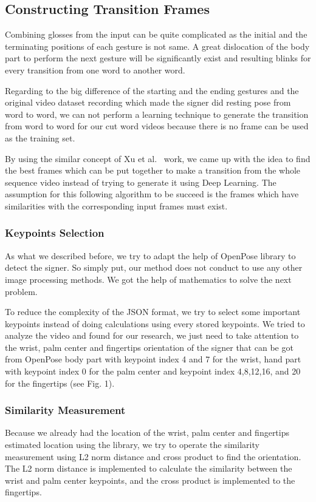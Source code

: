 \documentclass{sig-alternate-05-2015}
\begin{document}
\subsection{Constructing Transition Frames}
Combining glosses from the input can be quite complicated as the initial and the terminating positions of each gesture is not same. A great dislocation of the body part to perform the next gesture will be significantly exist and resulting blinks for every transition from one word to another word.

Regarding to the big difference of the starting and the ending gestures and the original video dataset recording which made the signer did resting pose from word to word, we can not perform a learning technique to generate the transition from word to word for our cut word videos because there is no frame can be used as the training set.

By using the similar concept of Xu et al.~\cite{AnimatingAnimalMotionFromStill} work, we came up with the idea to find the best frames which can be put together to make a transition from the whole sequence video instead of trying to generate it using Deep Learning. The assumption for this following algorithm to be succeed is the frames which have similarities with the corresponding input frames must exist.

\subsubsection{Keypoints Selection}
As what we described before, we try to adapt the help of OpenPose library to detect the signer. So simply put, our method does not conduct to use any other image processing methods. We got the help of mathematics to solve the next problem.

To reduce the complexity of the JSON format, we try to select some important keypoints instead of doing calculations using every stored keypoints. We tried to analyze the video and found for our research, we just need to take attention to the wrist, palm center and fingertips orientation of the signer that can be got from OpenPose body part with keypoint index 4 and 7 for the wrist, hand part with keypoint index 0 for the palm center and keypoint index 4,8,12,16, and 20 for the fingertips (see Fig. 1).

\subsubsection{Similarity Measurement}
Because we already had the location of the wrist, palm center and fingertips estimated location using the library, we try to operate the similarity measurement using L2 norm distance and cross product to find the orientation. The L2 norm distance is implemented to calculate the similarity between the wrist and palm center keypoints, and the cross product is implemented to the fingertips.
\end{document}
